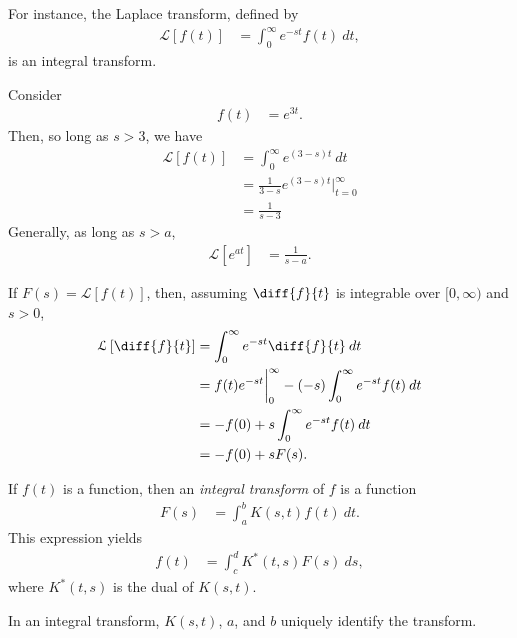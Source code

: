 \documentclass[10pt]{mypackage}
\begin{document}
For instance, the Laplace transform, defined by
  \begin{align*}
    \mathcal{L}\left[ f(t) \right] &= \int_{0}^{\infty} e^{-st}f(t)\:dt,
  \end{align*}
  is an integral transform.
\begin{example}
  Consider 
  \begin{align*}
    f(t) &= e^{3t}.
  \end{align*}
  Then, so long as $s > 3$, we have
  \begin{align*}
    \mathcal{L}\left[ f(t) \right] &= \int_{0}^{\infty} e^{\left( 3-s \right)t}\:dt\\
                                   &= \frac{1}{3-s}e^{\left( 3-s \right)t}\biggr\vert_{t=0}^{\infty}\\
                                   &= \frac{1}{s-3}
  \end{align*}
  Generally, as long as $s > a$,
  \begin{align*}
    \mathcal{L}\left[ e^{at} \right] &= \frac{1}{s-a}.
  \end{align*}
\end{example}
\begin{example}
  If $F(s) = \mathcal{L}\left[ f(t) \right]$, then, assuming $\diff{f}{t}$ is integrable over $[0,\infty)$ and $s > 0$,
  \begin{align*}
    \mathcal{L}\left[ \diff{f}{t} \right] &= \int_{0}^{\infty} e^{-st}\diff{f}{t}\:dt\\
                                          &= f(t)e^{-st}\biggr\vert_{0}^{\infty} - \left( -s \right) \int_{0}^{\infty} e^{-st}f(t)\:dt\\
                                          &= -f(0) + s\int_{0}^{\infty} e^{-st}f(t)\:dt\\
                                          &= -f(0) + sF(s).
  \end{align*}
\end{example}
\begin{definition}
  If $f(t)$ is a function, then an \textit{integral transform} of $f$ is a function
  \begin{align*}
    F(s) &= \int_{a}^{b} K\left( s,t \right)f(t)\:dt.
  \end{align*}
  This expression yields
  \begin{align*}
    f(t) &= \int_{c}^{d} K^{\ast}\left( t,s \right)F(s)\:ds,
  \end{align*}
  where $K^{\ast}\left( t,s \right)$ is the dual of $K\left( s,t \right)$.
\end{definition}
In an integral transform, $K\left( s,t \right)$, $a$, and $b$ uniquely identify the transform.\newline
\end{document}
